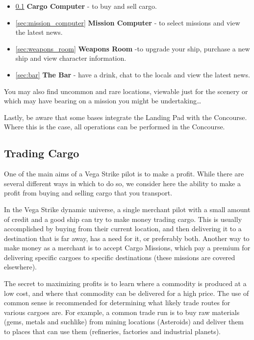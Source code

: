\documentclass{article}
\begin{document}
\begin{itemize}
\item  \ref{sec:cargo} \textbf{Cargo Computer} - to buy and sell cargo. 

\item  \ref{sec:mission_computer} \textbf{Mission Computer} - to select missions and view the latest news. 

\item  \ref{sec:weapons_room} \textbf{Weapons Room} -to upgrade your ship, purchase a new ship and view character information. 

\item  \ref{sec:bar} \textbf{The Bar} - have a drink, chat to the locals and view the latest news. 
\end{itemize}



You may also find uncommon and rare locations, viewable just for the scenery or which may have bearing on a mission you might be undertaking\dots  

Lastly, be aware that some bases integrate the Landing Pad with the Concourse. Where this is the case, all operations can be performed in the Concourse. 



\subsection{ Trading Cargo } \label{sec:cargo}

One of the main aims of a Vega Strike pilot is to make a profit. While there are several different ways in which to do so, we consider here the ability to make a profit from buying and selling cargo that you transport. 

In the Vega Strike dynamic universe, a single merchant pilot with a small amount of credit and a good ship can try to make money trading cargo. This is usually accomplished by buying from their current location, and then delivering it to a destination that is far away, has a need for it, or preferably both. Another way to make money as a merchant is to accept Cargo Missions, which pay a premium for delivering specific cargoes to specific destinations (these missions are covered elsewhere). 

The secret to maximizing profits is to learn where a commodity is produced at a low cost, and where that commodity can be delivered for a high price. The use of common sense is recommended for determining what likely trade routes for various cargoes are. For example, a common trade run is to buy raw materials (gems, metals and suchlike) from mining locations (Asteroids) and deliver them to places that can use them (refineries, factories and industrial planets). 
\end{document}
